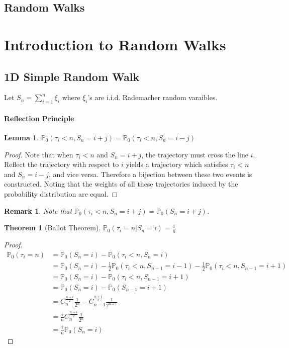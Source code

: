 \documentclass{article}
\newtheorem{Thm}{Theorem}[section]
\newtheorem{Lem}{Lemma}[section]
\newtheorem*{Rk}{Remark}
\theoremstyle{definition}
\newcommand{\PP}{\mathbb{P}}
\newcommand{\<}{\left\langle}
\renewcommand{\>}{\right\rangle}
\begin{document}
\subsection{Random Walks}


\section{Introduction to Random Walks}
\subsection{1D Simple Random Walk}
Let $S_n=\sum_{i=1}^{n}\xi_i$ where $\xi_i$'s are i.i.d. Rademacher random varaibles.
\paragraph{Reflection Principle}
\begin{Lem}
$\PP_0(\tau_i< n,S_n=i+j)=\PP_0(\tau_i< n,S_n=i-j)$
\end{Lem}
\begin{proof}
    Note that when $\tau_i<n$ and $S_n=i+j$, the trajectory must cross the line $i$. 
    Reflect the trajectory with respect to $i$ yields a trajectory which satisfies $\tau_i<n$ and $S_n=i-j$, and vice versa.
    Therefore a bijection between these two events is constructed. 
    Noting that the weights of all these trajectories induced by the probability distribution are equal.
\end{proof}
\begin{Rk}
    Note that $\PP_0(\tau_i< n,S_n=i+j)=\PP_0(S_n=i+j)$.
\end{Rk}

\begin{Thm}[Ballot Theorem]
    $\PP_0(\tau_i=n|S_n=i)=\frac{i}{n}$
\end{Thm}
\begin{proof}
    \begin{align*}
        \PP_0(\tau_i=n)&=\PP_0(S_n=i)-\PP_0(\tau_i<n,S_n=i)\\
                    &=\PP_0(S_n=i)-\frac{1}{2}\PP_0(\tau_i<n,S_{n-1}=i-1)-\frac{1}{2}\PP_0(\tau_i<n,S_{n-1}=i+1)\\
                    &=\PP_0(S_n=i)-\PP_0(\tau_i<n,S_{n-1}=i+1)\\
                    &=\PP_0(S_n=i)-\PP_0(S_{n-1}=i+1)\\
                    &=C_{n}^{\frac{n+i}{2}}\frac{1}{2^n}-C_{n-1}^{\frac{n+i}{2}}\frac{1}{2^{n-1}}\\
                    &=\frac{i}{n}C_{n}^{\frac{n+i}{2}}\frac{1}{2^n}\\
                    &=\frac{i}{n}\PP_0(S_n=i)
    \end{align*}
\end{proof}
\end{document}
